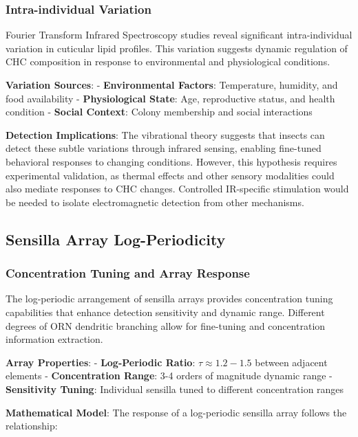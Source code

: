 \documentclass[
  13pt,
  a4paperpaper,
  12pt]{article}
\begin{document}
\subsubsection{Intra-individual
Variation}\label{intra-individual-variation}

Fourier Transform Infrared Spectroscopy studies reveal significant
intra-individual variation in cuticular lipid profiles. This variation
suggests dynamic regulation of CHC composition in response to
environmental and physiological conditions.

\textbf{Variation Sources}: - \textbf{Environmental Factors}:
Temperature, humidity, and food availability - \textbf{Physiological
State}: Age, reproductive status, and health condition - \textbf{Social
Context}: Colony membership and social interactions

\textbf{Detection Implications}: The vibrational theory suggests that
insects can detect these subtle variations through infrared sensing,
enabling fine-tuned behavioral responses to changing conditions.
However, this hypothesis requires experimental validation, as thermal
effects and other sensory modalities could also mediate responses to CHC
changes. Controlled IR-specific stimulation would be needed to isolate
electromagnetic detection from other mechanisms.

\subsection{Sensilla Array
Log-Periodicity}\label{sensilla-array-log-periodicity}

\subsubsection{Concentration Tuning and Array
Response}\label{concentration-tuning-and-array-response}

The log-periodic arrangement of sensilla arrays provides concentration
tuning capabilities that enhance detection sensitivity and dynamic
range. Different degrees of ORN dendritic branching allow for
fine-tuning and concentration information extraction.

\textbf{Array Properties}: - \textbf{Log-Periodic Ratio}:
\(\tau \approx 1.2-1.5\) between adjacent elements -
\textbf{Concentration Range}: 3-4 orders of magnitude dynamic range -
\textbf{Sensitivity Tuning}: Individual sensilla tuned to different
concentration ranges

\textbf{Mathematical Model}: The response of a log-periodic sensilla
array follows the relationship:
\end{document}

